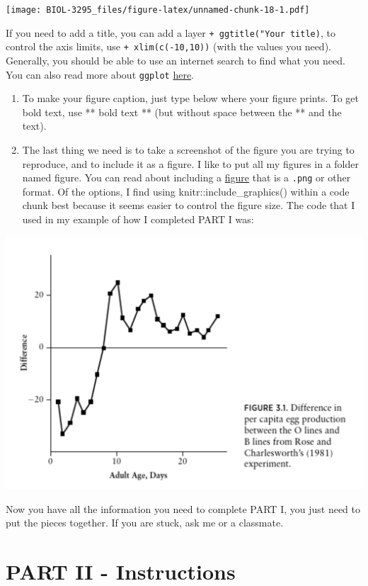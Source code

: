 \documentclass[
]{book}
\begin{document}
\texttt{[image: BIOL-3295\_files/figure-latex/unnamed-chunk-18-1.pdf]}

If you need to add a title, you can add a layer \texttt{+\ ggtitle("Your\ title)}, to control the axis limits, use \texttt{+\ xlim(c(-10,10))} (with the values you need). Generally, you should be able to use an internet search to find what you need. You can also read more about \texttt{ggplot} \href{https://ahurford.github.io/quant-guide-all-courses/ggplot.html}{here}.

\begin{enumerate}
\def\labelenumi{\arabic{enumi}.}
\setcounter{enumi}{6}
\item
  To make your figure caption, just type below where your figure prints. To get bold text, use ** bold text ** (but without space between the ** and the text).
\item
  The last thing we need is to take a screenshot of the figure you are trying to reproduce, and to include it as a figure. I like to put all my figures in a folder named figure. You can read about including a \href{https://bookdown.org/yihui/rmarkdown/r-code.html\#figures}{figure} that is a \texttt{.png} or other format. Of the options, I find using knitr::include\_graphics() within a code chunk best because it seems easier to control the figure size. The code that I used in my example of how I completed PART I was:
\end{enumerate}

\includegraphics[width=0.9\linewidth]{figures/actual-fig}

Now you have all the information you need to complete PART I, you just need to put the pieces together. If you are stuck, ask me or a classmate.

\hypertarget{partII}{%
\chapter*{PART II - Instructions}\label{partII}}
\end{document}
